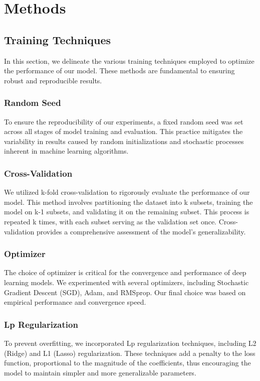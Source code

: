 \section{Methods}
\label{sec:methods}

\subsection{Training Techniques}
In this section, we delineate the various training techniques employed to optimize the performance of our model. These methods are fundamental to ensuring robust and reproducible results.

\subsubsection{Random Seed}
To ensure the reproducibility of our experiments, a fixed random seed was set across all stages of model training and evaluation. This practice mitigates the variability in results caused by random initializations and stochastic processes inherent in machine learning algorithms.

\subsubsection{Cross-Validation}
We utilized k-fold cross-validation to rigorously evaluate the performance of our model. This method involves partitioning the dataset into k subsets, training the model on k-1 subsets, and validating it on the remaining subset. This process is repeated k times, with each subset serving as the validation set once. Cross-validation provides a comprehensive assessment of the model’s generalizability.

\subsubsection{Optimizer}
The choice of optimizer is critical for the convergence and performance of deep learning models. We experimented with several optimizers, including Stochastic Gradient Descent (SGD), Adam, and RMSprop. Our final choice was based on empirical performance and convergence speed.

\subsubsection{Lp Regularization}
To prevent overfitting, we incorporated Lp regularization techniques, including L2 (Ridge) and L1 (Lasso) regularization. These techniques add a penalty to the loss function, proportional to the magnitude of the coefficients, thus encouraging the model to maintain simpler and more generalizable parameters.

